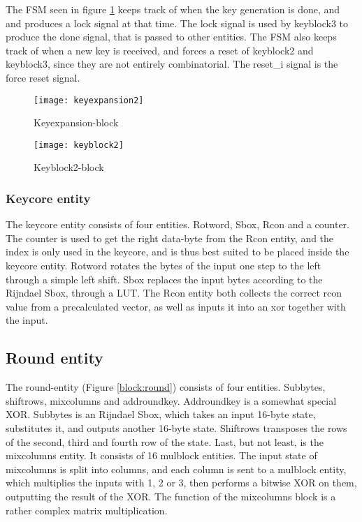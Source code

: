 The FSM seen in figure \ref{block:keyexpansion} keeps track of when the 
key generation is done, and and produces a lock signal at that time. 
The lock signal is used by keyblock3 to produce the done signal, that 
is passed to other entities. 
The FSM also keeps track of when a new key is received, and forces a 
reset of keyblock2 and keyblock3, since they are not entirely 
combinatorial. The reset\_i signal is the force reset signal. 

\begin{figure}[h!]
  \centering
  \texttt{[image: keyexpansion2]}
  \caption{Keyexpansion-block}
  \label{block:keyexpansion}
\end{figure}

\begin{figure}[h!]
  \centering
  \texttt{[image: keyblock2]}
  \caption{Keyblock2-block}
  \label{block:keyblock2}
\end{figure}

\subsubsection{Keycore entity}
The keycore entity consists of four entities. Rotword, Sbox, Rcon and a 
counter. The counter is used to get the right data-byte from the Rcon 
entity, and the index is only used in the keycore, and is thus best 
suited to be placed inside the keycore entity. Rotword rotates the 
bytes of the input one step to the left through a simple left shift. 
Sbox replaces the input bytes according to the Rijndael Sbox, through 
a LUT. The Rcon entity both collects the correct rcon value from a 
precalculated vector, as well as inputs it into an xor together with 
the input.

\subsection{Round entity}
The round-entity (Figure \ref{block:round}) consists of four entities. 
Subbytes, shiftrows, mixcolumns and addroundkey. Addroundkey is a 
somewhat special XOR. Subbytes is an Rijndael Sbox, which takes an 
input 16-byte state, substitutes it, and outputs another 16-byte state. 
Shiftrows transposes the rows of the second, third and fourth row of 
the state. Last, but not least, is the mixcolumns entity. It consists 
of 16 mulblock entities. The input state of mixcolumns is split into 
columns, and each column is sent to a mulblock entity, which multiplies 
the inputs with 1, 2 or 3, then performs a bitwise XOR on them, 
outputting the result of the XOR. The function of the mixcolumns block 
is a rather complex matrix multiplication.

